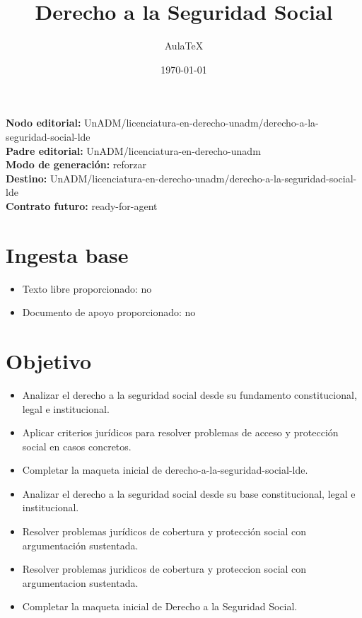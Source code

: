 \documentclass[12pt]{article}
\title{Derecho a la Seguridad Social}
\author{AulaTeX}
\date{\today}
\begin{document}
\maketitle

\noindent\textbf{Nodo editorial:} UnADM/licenciatura-en-derecho-unadm/derecho-a-la-seguridad-social-lde\\
\textbf{Padre editorial:} UnADM/licenciatura-en-derecho-unadm\\
\textbf{Modo de generación:} reforzar\\
\textbf{Destino:} UnADM/licenciatura-en-derecho-unadm/derecho-a-la-seguridad-social-lde\\
\textbf{Contrato futuro:} ready-for-agent

\section*{Ingesta base}
\begin{itemize}[leftmargin=*]
  \item Texto libre proporcionado: no
  \item Documento de apoyo proporcionado: no
\end{itemize}

\section*{Objetivo}
\begin{itemize}[leftmargin=*]
  \item Analizar el derecho a la seguridad social desde su fundamento constitucional, legal e institucional.
  \item Aplicar criterios jurídicos para resolver problemas de acceso y protección social en casos concretos.
  \item Completar la maqueta inicial de derecho-a-la-seguridad-social-lde.
  \item Analizar el derecho a la seguridad social desde su base constitucional, legal e institucional.
  \item Resolver problemas jurídicos de cobertura y protección social con argumentación sustentada.
  \item Resolver problemas juridicos de cobertura y proteccion social con argumentacion sustentada.
  \item Completar la maqueta inicial de Derecho a la Seguridad Social.
\end{itemize}
\end{document}
